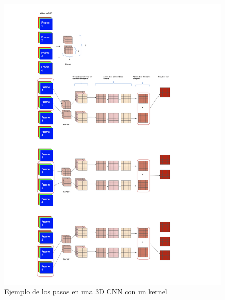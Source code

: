 \begin{onehalfspacing}
\begin{figure}[p]
	\centering
	\includegraphics[width=18cm,keepaspectratio]{XX_Figures/Fig_Ejemplo_3DCNN.png}
	\caption{\footnotesize Ejemplo de los pasos en una 3D CNN con un kernel}
	\label{fig:Fig_Ejemplo_3DCNN}
\end{figure}


\end{onehalfspacing}
